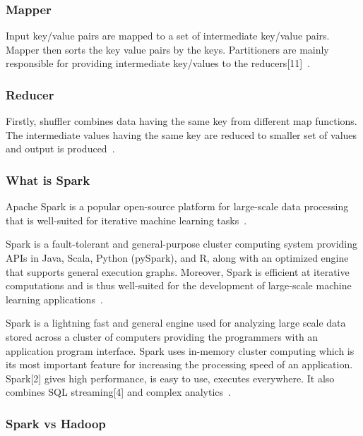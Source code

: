 \documentclass{report}
\begin{document}
\subsubsection{Mapper}
Input key/value pairs are mapped to a set of
intermediate key/value pairs. Mapper then sorts the key value pairs by the keys. Partitioners are mainly responsible for providing intermediate key/values to the reducers[11]~\cite{hazarika_performance_2017}.

\subsubsection{Reducer}

Firstly, shuffler combines data having the
same key from different map functions. The
intermediate values having the same key are
reduced to smaller set of values and output is produced~\cite{hazarika_performance_2017}.

\subsubsection{What is Spark}
Apache Spark is a popular open-source platform for large-scale data processing that is well-suited for iterative machine learning tasks~\cite{meng_mllib_2016}.

Spark is a fault-tolerant and general-purpose cluster computing system providing APIs in Java, Scala, Python (pySpark), and R, along with an optimized engine that supports general execution graphs. Moreover, Spark is efficient at iterative computations and is thus well-suited for the development of large-scale machine learning applications~\cite{meng_mllib_2016}.

Spark is a lightning fast and general engine used for analyzing large scale data stored across a cluster of computers providing the programmers with an application program interface. Spark uses in-memory cluster computing which is its most important feature for increasing the processing speed of an application. Spark[2] gives high performance, is easy to use, executes everywhere. It also combines SQL streaming[4] and complex analytics~\cite{hazarika_performance_2017}.

\subsubsection{Spark vs Hadoop}
\end{document}
